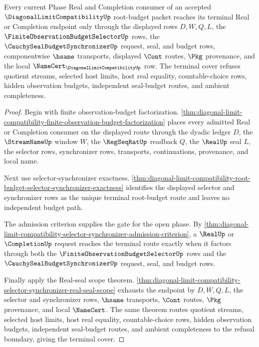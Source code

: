 \begin{theorem}
\label{thm:diagonal-limit-compatibility-open-phase-budget-terminal-cover}
Every current Phase Real and Completion consumer of an accepted $\DiagonalLimitCompatibilityUp$ root-budget packet reaches its terminal Real or Completion endpoint only through the displayed rows $D,W,Q,L$, the $\FiniteObservationBudgetSelectorUp$ rows, the $\CauchySealBudgetSynchronizerUp$ request, seal, and budget rows, componentwise $\hsame$ transports, displayed $\Cont$ routes, $\Pkg$ provenance, and the local $\NameCert_{\DiagonalLimitCompatibilityUp}$ row. The terminal cover refuses quotient streams, selected host limits, host real equality, countable-choice rows, hidden observation budgets, independent seal-budget routes, and ambient completeness.
\end{theorem}
\begin{proof}
Begin with finite observation-budget factorization. \autoref{thm:diagonal-limit-compatibility-finite-observation-budget-factorization} places every admitted Real or Completion consumer on the displayed route through the dyadic ledger $D$, the $\StreamNameUp$ window $W$, the $\RegSeqRatUp$ readback $Q$, the $\RealUp$ seal $L$, the selector rows, synchronizer rows, transports, continuations, provenance, and local name.

Next use selector-synchronizer exactness. \autoref{thm:diagonal-limit-compatibility-root-budget-selector-synchronizer-exactness} identifies the displayed selector and synchronizer rows as the unique terminal root-budget route and leaves no independent budget path.

The admission criterion supplies the gate for the open phase. By \autoref{thm:diagonal-limit-compatibility-selector-synchronizer-admission-criterion}, a $\RealUp$ or $\CompletionUp$ request reaches the terminal route exactly when it factors through both the $\FiniteObservationBudgetSelectorUp$ rows and the $\CauchySealBudgetSynchronizerUp$ request, seal, and budget rows.

Finally apply the Real-seal scope theorem. \autoref{thm:diagonal-limit-compatibility-selector-synchronizer-real-seal-scope} exhausts the endpoint by $D,W,Q,L$, the selector and synchronizer rows, $\hsame$ transports, $\Cont$ routes, $\Pkg$ provenance, and local $\NameCert$. The same theorem routes quotient streams, selected host limits, host real equality, countable-choice rows, hidden observation budgets, independent seal-budget routes, and ambient completeness to the refusal boundary, giving the terminal cover.
\end{proof}

